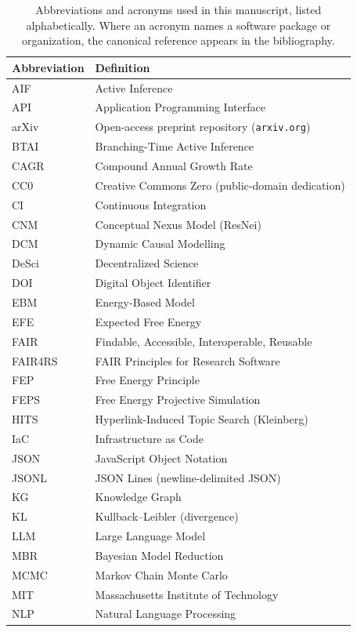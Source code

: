 \documentclass[
  english,
]{article}
\begin{document}
\begin{table}[H]
\centering
\caption{Abbreviations and acronyms used in this manuscript, listed alphabetically. Where an acronym names a software package or organization, the canonical reference appears in the bibliography.}
\label{tab:abbreviations}
\begin{tabular}{ll}
\toprule
\textbf{Abbreviation} & \textbf{Definition} \\
\midrule
AIF & Active Inference \\
API & Application Programming Interface \\
arXiv & Open-access preprint repository (\texttt{arxiv.org}) \\
BTAI & Branching-Time Active Inference \\
CAGR & Compound Annual Growth Rate \\
CC0 & Creative Commons Zero (public-domain dedication) \\
CI & Continuous Integration \\
CNM & Conceptual Nexus Model (ResNei) \\
DCM & Dynamic Causal Modelling \\
DeSci & Decentralized Science \\
DOI & Digital Object Identifier \\
EBM & Energy-Based Model \\
EFE & Expected Free Energy \\
FAIR & Findable, Accessible, Interoperable, Reusable \\
FAIR4RS & FAIR Principles for Research Software \\
FEP & Free Energy Principle \\
FEPS & Free Energy Projective Simulation \\
HITS & Hyperlink-Induced Topic Search (Kleinberg) \\
IaC & Infrastructure as Code \\
JSON & JavaScript Object Notation \\
JSONL & JSON Lines (newline-delimited JSON) \\
KG & Knowledge Graph \\
KL & Kullback--Leibler (divergence) \\
LLM & Large Language Model \\
MBR & Bayesian Model Reduction \\
MCMC & Markov Chain Monte Carlo \\
MIT & Massachusetts Institute of Technology \\
NLP & Natural Language Processing \\

\end{tabular}
\end{table}
\end{document}
